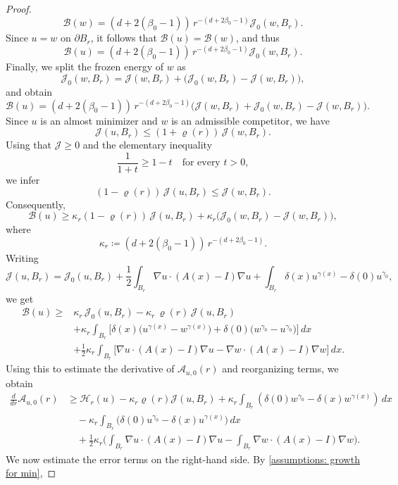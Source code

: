 \documentclass[reqno,11pt]{amsart}
\newcommand{\1}{\mathds{1}}  %
\numberwithin{equation}{section}
\begin{document}
\begin{proof}
\[
    \mathcal{B}(w)=(d+2(\beta_0-1))\,r^{-(d+2\beta_0-1)}\mathcal{J}_{0}(w,B_r).
\]
Since $u=w$ on $\partial B_r$, it follows that $\mathcal{B}(u)=\mathcal{B}(w)$, and thus
\[
    \mathcal{B}(u)=(d+2(\beta_0-1))\,r^{-(d+2\beta_0-1)}\mathcal{J}_{0}(w,B_r).
\]
Finally, we split the frozen energy of $w$ as
\[
    \mathcal{J}_{0}(w,B_r)=\mathcal{J}(w,B_r)+\bigl(\mathcal{J}_{0}(w,B_r)-\mathcal{J}(w,B_r)\bigr),
\]
and obtain
\[
    \mathcal{B}(u)=(d+2(\beta_0-1))\,r^{-(d+2\beta_0-1)} \Big(\mathcal{J}(w,B_r)+\mathcal{J}_{0}(w,B_r)-\mathcal{J}(w,B_r)\Big).
\]
Since $u$ is an almost minimizer and $w$ is an admissible competitor, we have
\[
    \mathcal{J}(u,B_r)\le (1+\varrho(r))\,\mathcal{J}(w,B_r).
\]
Using that $\mathcal{J}\ge 0$ and the elementary inequality
\[
    \frac{1}{1+t}\ge 1-t \quad\text{for every } t>0,
\]
we infer
\[
    (1-\varrho(r))\,\mathcal{J}(u,B_r)\le \mathcal{J}(w,B_r).
\]
Consequently,
\[
    \mathcal{B}(u)
    \ge \kappa_r(1-\varrho(r))\,\mathcal{J}(u,B_r)
    + \kappa_r\bigl(\mathcal{J}_0(w,B_r)-\mathcal{J}(w,B_r)\bigr),
\]
where
\[
    \kappa_r \coloneqq (d+2(\beta_0-1))\,r^{-(d+2\beta_0-1)}.
\]
Writing 
\[
	\mathcal{J}(u,B_r) = \mathcal{J}_0(u,B_r) + \frac{1}{2}\int_{B_r} \nabla u \cdot (A(x) - I)\nabla u + \int_{B_r}\delta(x)u^{\gamma(x)} - \delta(0)u^{\gamma_0},
\]
we get
\begin{align*}
\mathcal{B}(u) \ge {}&
\kappa_r\,\mathcal{J}_0(u,B_r)
-\kappa_r\,\varrho(r)\,\mathcal{J}(u,B_r)
\\
&+\kappa_r \int_{B_r}\Big[
\delta(x)\big(u^{\gamma(x)}-w^{\gamma(x)}\big)
+\delta(0)\big(w^{\gamma_0}-u^{\gamma_0}\big)
\Big]\,dx
\\
&+\frac{1}{2}\kappa_r \int_{B_r}\Big[
\nabla u\cdot(A(x)-I)\nabla u
-\nabla w\cdot(A(x)-I)\nabla w
\Big]\,dx.
\end{align*}
Using this to estimate the derivative of $\mathcal{A}_{u,0}(r)$ and reorganizing terms, we obtain
\begin{align*}
    \frac{d}{dr} \mathcal{A}_{u,0}(r) & \geq \mathcal{H}_r(u) - \kappa_r \varrho(r)\mathcal{J}(u,B_r) + \kappa_r \int_{B_r}\left(\delta(0)w^{\gamma_0} - \delta(x)w^{\gamma(x)} \right)\,dx\\
    & \quad - \kappa_r \int_{B_r}\Big(\delta(0)u^{\gamma_0} - \delta(x)u^{\gamma(x)} \Big)\,dx\\
    & \quad + \frac{1}{2}\kappa_r \bigg(\int_{B_r} \nabla u \cdot (A(x) - I)\nabla u - \int_{B_r} \nabla w \cdot (A(x) - I)\nabla w\bigg).
\end{align*}
We now estimate the error terms on the right-hand side. By \eqref{assumptions: growth for min},

\end{proof}
\end{document}
